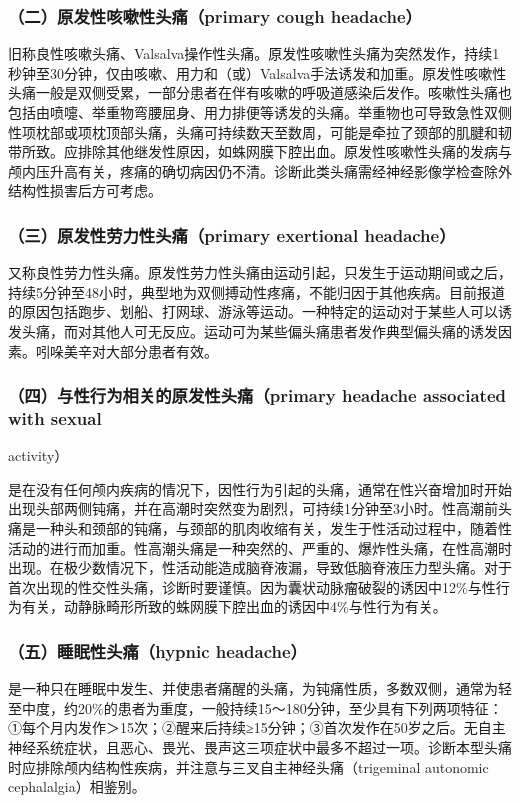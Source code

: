 \subsubsection{（二）原发性咳嗽性头痛（primary cough headache）}

旧称良性咳嗽头痛、Valsalva操作性头痛。原发性咳嗽性头痛为突然发作，持续1秒钟至30分钟，仅由咳嗽、用力和（或）Valsalva手法诱发和加重。原发性咳嗽性头痛一般是双侧受累，一部分患者在伴有咳嗽的呼吸道感染后发作。咳嗽性头痛也包括由喷嚏、举重物弯腰屈身、用力排便等诱发的头痛。举重物也可导致急性双侧性项枕部或项枕顶部头痛，头痛可持续数天至数周，可能是牵拉了颈部的肌腱和韧带所致。应排除其他继发性原因，如蛛网膜下腔出血。原发性咳嗽性头痛的发病与颅内压升高有关，疼痛的确切病因仍不清。诊断此类头痛需经神经影像学检查除外结构性损害后方可考虑。

\subsubsection{（三）原发性劳力性头痛（primary exertional headache）}

又称良性劳力性头痛。原发性劳力性头痛由运动引起，只发生于运动期间或之后，持续5分钟至48小时，典型地为双侧搏动性疼痛，不能归因于其他疾病。目前报道的原因包括跑步、划船、打网球、游泳等运动。一种特定的运动对于某些人可以诱发头痛，而对其他人可无反应。运动可为某些偏头痛患者发作典型偏头痛的诱发因素。吲哚美辛对大部分患者有效。

\subsubsection{（四）与性行为相关的原发性头痛（primary headache associated with sexual}
activity）

是在没有任何颅内疾病的情况下，因性行为引起的头痛，通常在性兴奋增加时开始出现头部两侧钝痛，并在高潮时突然变为剧烈，可持续1分钟至3小时。性高潮前头痛是一种头和颈部的钝痛，与颈部的肌肉收缩有关，发生于性活动过程中，随着性活动的进行而加重。性高潮头痛是一种突然的、严重的、爆炸性头痛，在性高潮时出现。在极少数情况下，性活动能造成脑脊液漏，导致低脑脊液压力型头痛。对于首次出现的性交性头痛，诊断时要谨慎。因为囊状动脉瘤破裂的诱因中12\%与性行为有关，动静脉畸形所致的蛛网膜下腔出血的诱因中4\%与性行为有关。

\subsubsection{（五）睡眠性头痛（hypnic headache）}

是一种只在睡眠中发生、并使患者痛醒的头痛，为钝痛性质，多数双侧，通常为轻至中度，约20\%的患者为重度，一般持续15～180分钟，至少具有下列两项特征：①每个月内发作＞15次；②醒来后持续≥15分钟；③首次发作在50岁之后。无自主神经系统症状，且恶心、畏光、畏声这三项症状中最多不超过一项。诊断本型头痛时应排除颅内结构性疾病，并注意与三叉自主神经头痛（trigeminal
autonomic cephalalgia）相鉴别。


